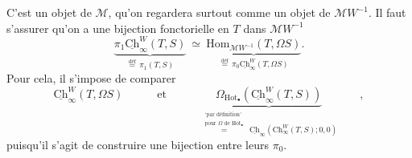 \documentclass[11pt]{article}
\newcommand{\printedpage}[1]{\marginpar{\footnotesize p.~#1}}
\newcommand{\Chu}{\underline{\mathrm{Ch}}}
\newcommand{\Hot}{\mathrm{Hot}}
\begin{document}
\newpage

\printedpage{16}

C'est un objet de $\mathcal{M}$, qu'on regardera surtout comme un objet de $\mathcal{M}W^{-1}$. Il faut s'assurer qu'on a une bijection fonctorielle en $T$ dans $\mathcal{M}W^{-1}$
\[
\underbrace{\pi_1\Chu^W_\infty(T, S)}_{\overset{\text{déf}}{=}\,\pi_1(T,S)} \ \simeq\ \underbrace{\mathrm{Hom}_{\mathcal{M}W^{-1}}(T, \Omega S)}_{\overset{\text{déf}}{=}\,\pi_0\Chu^W_\infty(T,\Omega S)}.
\]
Pour cela, il s'impose de comparer
\[
\Chu^W_\infty(T, \Omega S) \qquad\quad \text{et} \qquad\quad \underbrace{\Omega_{\Hot_\bullet}(\Chu^W_\infty(T, S))}_{\overset{\substack{\text{`par définition'}\\ \text{pour $\Omega$ de $\mathrm{Hot}_\bullet$}}}{=}\ \Chu_\infty(\mathrm{Ch}^W_\infty(T,S);0,0)} \qquad ,
\]
puisqu'il s'agit de construire une bijection entre leurs $\pi_0$.
\end{document}
